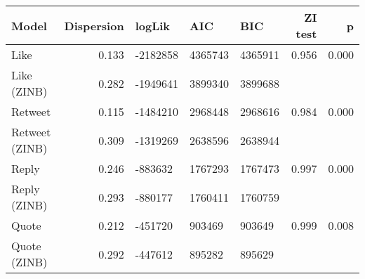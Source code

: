 \begin{tabular}{lrlllrr}
\toprule
          Model &  Dispersion &   logLik &     AIC &     BIC &  ZI test &     p \\
\midrule
          Like  &       0.133 & -2182858 & 4365743 & 4365911 &    0.956 & 0.000 \\
   Like  (ZINB) &       0.282 & -1949641 & 3899340 & 3899688 &       &    \\
       Retweet  &       0.115 & -1484210 & 2968448 & 2968616 &    0.984 & 0.000 \\
Retweet  (ZINB) &       0.309 & -1319269 & 2638596 & 2638944 &       &    \\
         Reply  &       0.246 &  -883632 & 1767293 & 1767473 &    0.997 & 0.000 \\
  Reply  (ZINB) &       0.293 &  -880177 & 1760411 & 1760759 &       &    \\
         Quote  &       0.212 &  -451720 &  903469 &  903649 &    0.999 & 0.008 \\
  Quote  (ZINB) &       0.292 &  -447612 &  895282 &  895629 &       &    \\
\bottomrule
\end{tabular}
